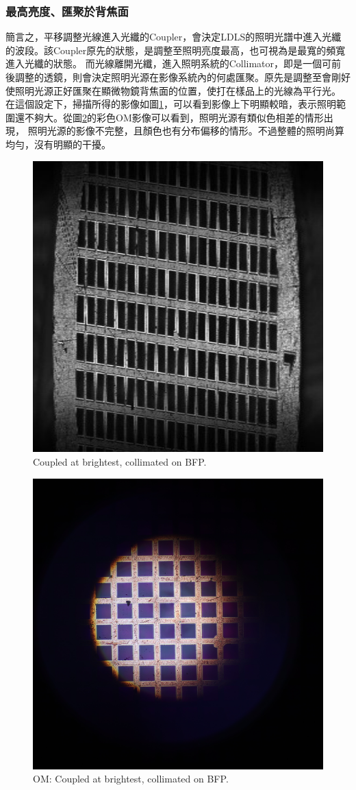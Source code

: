 \documentclass[12pt]{article}
\begin{document}
\subsubsection{最高亮度、匯聚於背焦面} \label{section: illuOriginal}
簡言之，平移調整光線進入光纖的Coupler，會決定LDLS的照明光譜中進入光纖的波段。該Coupler原先的狀態，是調整至照明亮度最高，也可視為是最寬的頻寬進入光纖的狀態。
而光線離開光纖，進入照明系統的Collimator，即是一個可前後調整的透鏡，則會決定照明光源在影像系統內的何處匯聚。原先是調整至會剛好使照明光源正好匯聚在顯微物鏡背焦面的位置，使打在樣品上的光線為平行光。
在這個設定下，掃描所得的影像如圖\ref{figure: brightest_on}，可以看到影像上下明顯較暗，表示照明範圍還不夠大。從圖\ref{figure: om_brightest_on}的彩色OM影像可以看到，照明光源有類似色相差的情形出現，
照明光源的影像不完整，且顏色也有分布偏移的情形。不過整體的照明尚算均勻，沒有明顯的干擾。
\begin{figure}[t]
    \centering
    \includegraphics[width=0.5\linewidth]{on_brightest.jpg}
    \caption{Coupled at brightest, collimated on BFP.}
    \label{figure: brightest_on}
\end{figure}
\begin{figure}[t]
    \centering
    \includegraphics[width=0.5\linewidth]{om_on_brightest.JPG}
    \caption{OM: Coupled at brightest, collimated on BFP.}
    \label{figure: om_brightest_on}
\end{figure}
\end{document}
